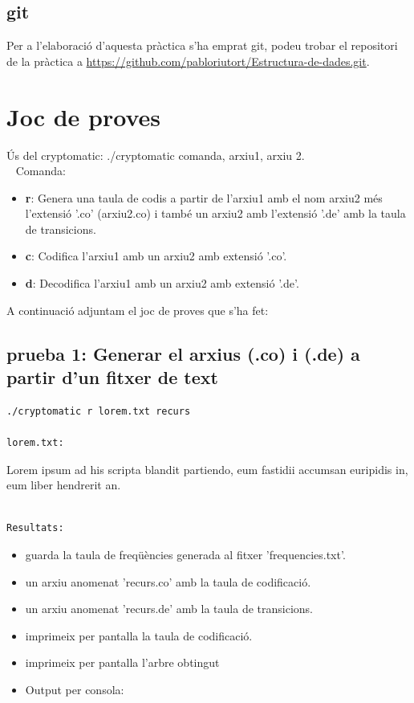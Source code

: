\documentclass[a4paper,12pt]{article}
\begin{document}
\subsection{git}
Per a l'elaboració d'aquesta pràctica s'ha emprat git, podeu trobar el repositori de la pràctica a \url{https://github.com/pabloriutort/Estructura-de-dades.git}.

\pagebreak
\section{Joc de proves}
Ús del cryptomatic: ./cryptomatic comanda, arxiu1, arxiu 2.\\\
\newline
Comanda:
\begin{itemize}
 \item \textbf{r}: Genera una taula de codis a partir de l'arxiu1 amb el nom arxiu2 més l'extensió '.co' (arxiu2.co) i també un arxiu2 amb l'extensió '.de' amb la taula de transicions.
 \item \textbf{c}: Codifica l'arxiu1 amb un arxiu2 amb extensió '.co'.
 \item \textbf{d}: Decodifica l'arxiu1 amb un arxiu2 amb extensió '.de'.
\end{itemize}

A continuació adjuntam el joc de proves que s'ha fet:

\subsection{prueba 1: Generar el arxius (.co) i (.de) a partir d'un fitxer de text}

\begin{lstlisting}
./cryptomatic r lorem.txt recurs

lorem.txt:
\end{lstlisting}

Lorem ipsum ad his scripta blandit partiendo, eum fastidii accumsan euripidis in, eum liber hendrerit an.\\\

\begin{lstlisting}
Resultats:
\end{lstlisting}

\begin{itemize}
 \item guarda la taula de freqüències generada al fitxer 'frequencies.txt'.
 \item un arxiu anomenat 'recurs.co' amb la taula de codificació.
 \item un arxiu anomenat 'recurs.de' amb la taula de transicions.
 \item imprimeix per pantalla la taula de codificació.
 \item imprimeix per pantalla l'arbre obtingut
 \item Output per consola:
\end{itemize}
\end{document}
